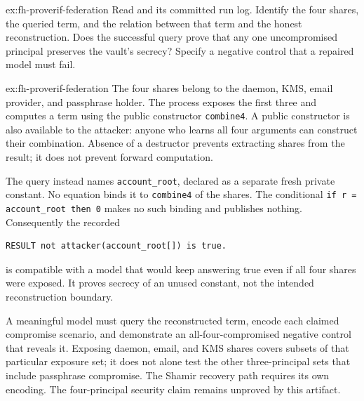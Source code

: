 \documentclass[11pt,a4paper]{article}
\theoremstyle{definition}
\theoremstyle{remark}
\begin{document}
\begin{pdexercise}[kind=Trace,rating=2]{ex:fh-proverif-federation}
Read  and its committed run log. Identify the four shares, the queried term, and the relation between that term and the honest reconstruction. Does the successful query prove that any one uncompromised principal preserves the vault's secrecy? Specify a negative control that a repaired model must fail.
\end{pdexercise}
\begin{pdsolution}{ex:fh-proverif-federation}
The four shares belong to the daemon, KMS, email provider, and passphrase holder. The process exposes the first three and computes a term using the public constructor \texttt{combine4}. A public constructor is also available to the attacker: anyone who learns all four arguments can construct their combination. Absence of a destructor prevents extracting shares from the result; it does not prevent forward computation.

The query instead names \texttt{account\_root}, declared as a separate fresh private constant. No equation binds it to \texttt{combine4} of the shares. The conditional \texttt{if r = account\_root then 0} makes no such binding and publishes nothing. Consequently the recorded
\begin{lstlisting}
RESULT not attacker(account_root[]) is true.
\end{lstlisting}
is compatible with a model that would keep answering true even if all four shares were exposed. It proves secrecy of an unused constant, not the intended reconstruction boundary.

A meaningful model must query the reconstructed term, encode each claimed compromise scenario, and demonstrate an all-four-compromised negative control that reveals it. Exposing daemon, email, and KMS shares covers subsets of that particular exposure set; it does not alone test the other three-principal sets that include passphrase compromise. The Shamir recovery path requires its own encoding. The four-principal security claim remains unproved by this artifact.
\end{pdsolution}

\end{document}
